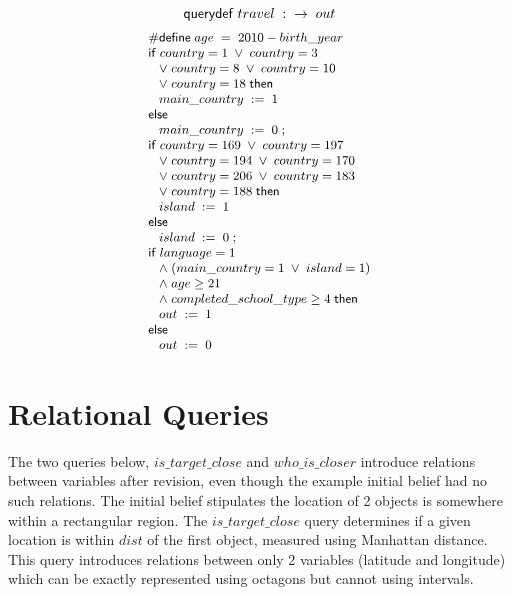 $$ \squerydefk \; travel \; : \; \; \ra \; out$$
\begin{displaymath}{\small
\begin{array}{l}
  \psdefine{age}{\ebinop{-}{2010}{birth\text{\_}year}}\\
  \sifk \; \lbinop{\vee}{\lbinop{\vee}{\lbinop{\vee}{\lbinop{\vee}{\lreln{=}{country}{1}}{\lreln{=}{country}{3}\\\;\;}}{\lreln{=}{country}{8}}}{\lreln{=}{country}{10}\\\;\;}}{\lreln{=}{country}{18}} \; \sthenk\\
  \;\;\;\sassign{main\text{\_}country}{1}\\
  \selsek\\
  \;\;\;\sassign{main\text{\_}country}{0}\; ;\\
  \sifk \; \lbinop{\vee}{\lbinop{\vee}{\lbinop{\vee}{\lbinop{\vee}{\lbinop{\vee}{\lbinop{\vee}{\lreln{=}{country}{169}}{\lreln{=}{country}{197}\\\;\;}}{\lreln{=}{country}{194}}}{\lreln{=}{country}{170}\\\;\;}}{\lreln{=}{country}{206}}}{\lreln{=}{country}{183}\\\;\;}}{\lreln{=}{country}{188}} \; \sthenk\\
  \;\;\;\sassign{island}{1}\\
  \selsek\\
  \;\;\;\sassign{island}{0}\; ;\\
  \sifk \; \lbinop{\wedge}{\lbinop{\wedge}{\lbinop{\wedge}{\lreln{=}{language}{1}\\\;\;}{\lbinop{\vee}{(\lreln{=}{main\text{\_}country}{1}}{\lreln{=}{island}{1})\\\;\;}}}{\lreln{\geq}{age}{21}\\\;\;}}{\lreln{\geq}{completed\text{\_}school\text{\_}type}{4}} \; \sthenk\\
  \;\;\;\sassign{out}{1}\\
  \selsek\\
  \;\;\;\sassign{out}{0}\\
\end{array}
}
\end{displaymath}

\section{Relational Queries} \label{sec-appendix-relational}

The two queries below, $ is\text{\_}target\text{\_}close $ and $
who\text{\_}is\text{\_}closer $ introduce relations between variables
after revision, even though the example initial belief had no such
relations. The initial belief stipulates the location of 2 objects is
somewhere within a rectangular region. The $
is\text{\_}target\text{\_}close $ query determines if a given location
is within $ dist $ of the first object, measured using Manhattan
distance. This query introduces relations between only 2 variables
(latitude and longitude) which can be exactly represented using
octagons but cannot using intervals.

